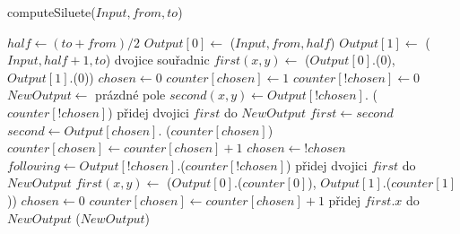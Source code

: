 \documentclass[12pt]{iv003}
\begin{document}

{\small \begin{procedure}[H]
    \caption{computeSiluete($Input, from, to$) }
    $half \leftarrow (to + from)/2$ \;
    $Output[0] \leftarrow$ \ffcomputeSiluete($Input, from, half$) \;
    $Output[1] \leftarrow$ \ffcomputeSiluete($Input, half+1, to$) \;
	dvojice souřadnic $first(x,y) \leftarrow$ \ffmin($Output[0]$.\fftakePair(0), $Output[1]$.\fftakePair(0)) 
	 {
		$chosen \leftarrow 0$
	}
	$counter[chosen] \leftarrow 1$ \;
	$counter[!chosen] \leftarrow 0$ \;
	$NewOutput \leftarrow$ prázdné pole \;
     {
		$second(x,y) \leftarrow Output[!chosen].$ \fftakePair($counter[!chosen]$) \;
		 {
			přidej dvojici $first$ do $NewOutput$ \;
			$first \leftarrow second$ \;
			$second \leftarrow Output[chosen].$ \fftakePair($counter[chosen]$) \;
			$counter[chosen] \leftarrow counter[chosen] + 1$ \;
			$chosen \leftarrow !chosen$ \;
		}
		$following \leftarrow Output[!chosen].$\fftakePair($counter[!chosen]$) \;
		 {
			přidej dvojici $first$ do $NewOutput$ \;
			$first(x,y) \leftarrow$ \ffmin($Output[0]$.\fftakePair($counter[0]$), $Output[1]$.\fftakePair($counter[1]$)) \;
			 {
				$chosen \leftarrow 0$
			}
			$counter[chosen] \leftarrow counter[chosen] + 1$ \;
		}
    }
    přidej $first.x$ do $NewOutput$ \;
    \Return($NewOutput$)
\end{procedure}}
\end{document}
